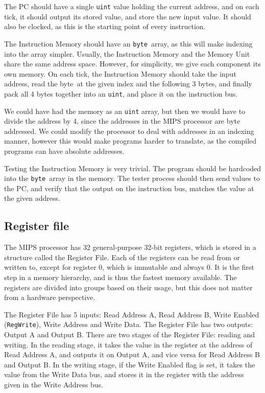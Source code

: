 The PC should have a single \texttt{uint} value holding the current address,
and on each tick, it should output its stored value, and store the new input
value. It should also be clocked, as this is the starting point of every
instruction.

The Instruction Memory should have an \texttt{byte} array, as this will make
indexing into the array simpler. Usually, the Instruction Memory and the Memory
Unit share the same address space. However, for simplicity, we give each
component its own memory. On each tick, the Instruction Memory should take the
input address, read the byte at the given index and the following 3 bytes, and
finally pack all 4 bytes together into an \texttt{uint}, and place it on the
instruction bus.

We could have had the memory as an \texttt{uint} array, but then we would have
to divide the address by 4, since the addresses in the MIPS processor are byte
addressed. We could modify the processor to deal with addresses in an indexing
manner, however this would make programs harder to translate, as the compiled
programs can have absolute addresses.

Testing the Instruction Memory is very trivial. The program should be hardcoded
into the \texttt{byte} array in the memory. The tester process should then send
values to the PC, and verify that the output on the instruction bus, matches
the value at the given address.

\subsection{Register file}
The MIPS processor has 32 general-purpose 32-bit registers, which is stored in
a structure called the Register File. Each of the registers can be read from or
written to, except for register 0, which is immutable and always 0. It is the
first step in a memory hierarchy, and is thus the fastest memory available.
The registers are divided into groups based on their usage, but this does not
matter from a hardware perspective.

The Register File has 5 inputs: Read Address A, Read Address B, Write Enabled
(\texttt{RegWrite}), Write Address and Write Data. The Register File has two
outputs: Output A and Output B.  There are two stages of the Register File:
reading and writing. In the reading stage, it takes the value in the register
at the address of Read Address A, and outputs it on Output A, and vice versa
for Read Address B and Output B. In the writing stage, if the Write Enabled
flag is set, it takes the value from the Write Data bus, and stores it in the
register with the address given in the Write Address bus.

